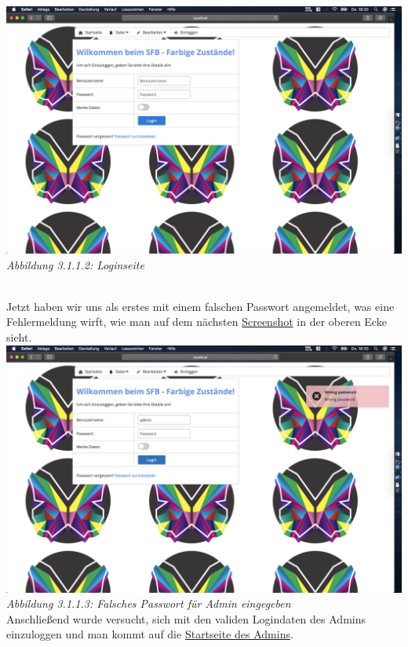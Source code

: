 \documentclass[enabledeprecatedfontcommands,fontsize=12pt,paper=a4,twoside]{scrartcl}
\begin{document}
\hypertarget{sc3.1.1.2}{
\includegraphics[width=1\textwidth]{Screenshots/311LoginSite.png}
\textit{Abbildung 3.1.1.2: Loginseite}
} \\

Jetzt haben wir uns als erstes mit einem falschen Passwort angemeldet, was eine Fehlermeldung wirft, wie man auf dem nächsten  \hyperlink{sc3.1.1.3}{Screenshot} in der oberen Ecke sieht.\\

\hypertarget{sc3.1.1.3}{
\includegraphics[width=1\textwidth]{Screenshots/311wrongPassword.png}
\textit{Abbildung 3.1.1.3: Falsches Passwort für Admin eingegeben}
} \\

Anschließend wurde versucht, sich mit den validen Logindaten des Admins einzuloggen und man kommt auf die \hyperlink{sc3.1.1.4}{Startseite des Admins}. \\
\end{document}
